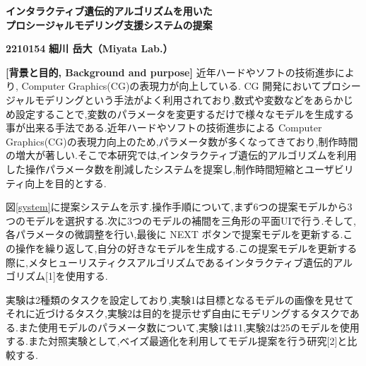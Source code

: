 \documentclass[a4j,11pt]{article}
\begin{document}
\renewcommand{\baselinestretch}{1.04}\small\normalsize %

\begin{flushleft}
\end{flushleft}

\begin{center}
\vspace{-5.5mm}
\textbf{\Large
インタラクティブ遺伝的アルゴリズムを用いた\\
プロシージャルモデリング支援システムの提案}
\end{center}

\begin{flushright}
\vspace{-2mm} 
\textbf{2210154}
\textbf{細川 岳大（Miyata Lab.）}
\end{flushright}

\vspace{-1mm}
\noindent
\textbf{[背景と目的, Background and purpose]}
\indent
近年ハードやソフトの技術進歩により, Computer Graphics(CG)の表現力が向上している.
CG 開発においてプロシージャルモデリングという手法がよく利用されており,数式や変数などをあらかじめ設定することで,変数のパラメータを変更するだけで様々なモデルを生成する事が出来る手法である.近年ハードやソフトの技術進歩による Computer Graphics(CG)の表現力向上のため,パラメータ数が多くなってきており,制作時間の増大が著しい.そこで本研究では,インタラクティブ遺伝的アルゴリズムを利用した操作パラメータ数を削減したシステムを提案し,制作時間短縮とユーザビリティ向上を目的とする.
\vspace{0.5mm}

\indent
図\ref{system}に提案システムを示す.操作手順について,まず6つの提案モデルから3つのモデルを選択する.次に3つのモデルの補間を三角形の平面UIで行う.そして,各パラメータの微調整を行い,最後に NEXT ボタンで提案モデルを更新する.この操作を繰り返して,自分の好きなモデルを生成する.この提案モデルを更新する際に,メタヒューリスティクスアルゴリズムであるインタラクティブ遺伝的アルゴリズム[1]を使用する.
\vspace{0.5mm}

\indent
実験は2種類のタスクを設定しており,実験1は目標となるモデルの画像を見せてそれに近づけるタスク,実験2は目的を提示せず自由にモデリングするタスクである.また使用モデルのパラメータ数について,実験1は11,実験2は25のモデルを使用する.また対照実験として,ベイズ最適化を利用してモデル提案を行う研究[2]と比較する.
\end{document}

